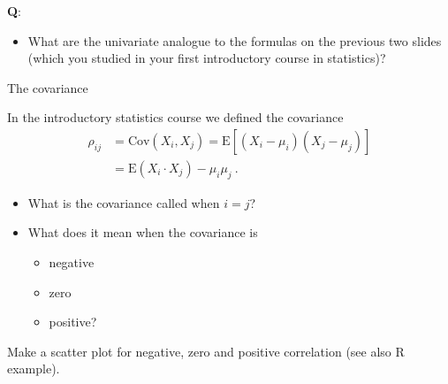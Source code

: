 \documentclass[
  ignorenonframetext,
]{beamer}
\providecommand{\tightlist}{%
  \setlength{\itemsep}{0pt}\setlength{\parskip}{0pt}}
\begin{document}
\begin{frame}
\textbf{Q}:

\begin{itemize}
\tightlist
\item
  What are the univariate analogue to the formulas on the previous two
  slides (which you studied in your first introductory course in
  statistics)?
\end{itemize}

\vspace{80mm}
\end{frame}

\begin{frame}
\begin{block}{The covariance}
\protect\hypertarget{the-covariance}{}
\vspace{2mm}

In the introductory statistics course we defined the covariance
\begin{align*}
\rho_{ij} & =\text{Cov}(X_i,X_j)  =\text{E}[(X_i-\mu_i)(X_j-\mu_j)] \\
& =\text{E}(X_i \cdot X_j)-\mu_i\mu_j \ . 
\end{align*}

\begin{itemize}
\tightlist
\item
  What is the covariance called when \(i=j\)?
\end{itemize}

\vspace{2mm}

\begin{itemize}
\tightlist
\item
  What does it mean when the covariance is

  \begin{itemize}
  \tightlist
  \item
    negative
  \item
    zero
  \item
    positive?
  \end{itemize}
\end{itemize}
\end{block}
\end{frame}

\begin{frame}
Make a scatter plot for negative, zero and positive correlation (see
also R example).

\vspace{6cm}
\end{frame}
\end{document}
